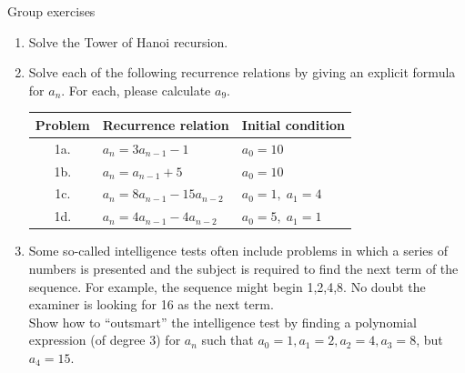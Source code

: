 \documentclass[10pt]{beamer}
\begin{document}
\begin{frame}{Group exercises}
\begin{enumerate} 
	\item Solve the Tower of Hanoi recursion.
	\vfill \vfill
	\item Solve each of the following recurrence relations by giving an explicit formula for $a_n$.  For each, please calculate $a_9$.
	\vspace{.5cm}
	\begin{tabular}{cll}
	\toprule 
	\textbf{Problem} & \textbf{Recurrence relation} & \textbf{Initial condition} \\
	\midrule 
	1a. & $a_n = 3 a_{n-1} -1$ & $ a_0=10$ \\
	1b. &  $a_n = a_{n-1} + 5$ & $  a_0=10$ \\
	1c. & $a_n = 8 a_{n-1} - 15a_{n-2}$ & $a_0=1, \; a_1=4$ \\
	1d. & $a_n = 4 a_{n-1} -4 a_{n-2}$ & $a_0=5, \; a_1=1$ \\
	\bottomrule
	\end{tabular}
	\vfill \vfill 
	\item Some so-called intelligence tests often include problems in which a series of numbers is presented and the subject is required to find the next term of the sequence.  For example, the sequence might begin 1,2,4,8.  No doubt the examiner is looking for 16 as the next term. \\
	\vspace{.25cm}
	Show how to \enquote{outsmart} the intelligence test by finding a polynomial expression (of degree 3) for $a_n$ such that $a_0=1, a_1=2, a_2=4, a_3=8$, but $a_4=15$.

\end{enumerate}
\end{frame}
\end{document}
